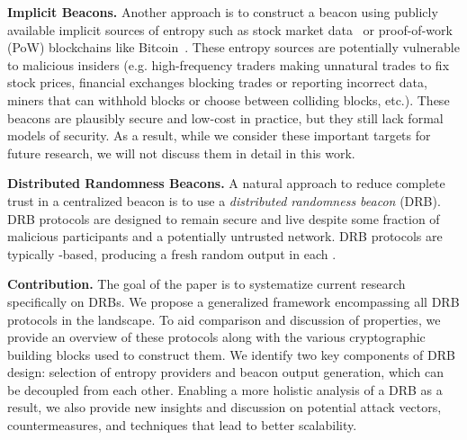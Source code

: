 \textbf{Implicit Beacons.} Another approach is to construct a beacon using publicly available implicit sources of entropy such as stock market data~\cite{clark2010use} or proof-of-work (PoW) blockchains like Bitcoin~\cite{nakamoto2008bitcoin, bentov2016bitcoin, bonneau2015bitcoin, han2020randchain}. These entropy sources are potentially vulnerable to malicious insiders (e.g. high-frequency traders making unnatural trades to fix stock prices, financial exchanges blocking trades or reporting incorrect data, miners that can withhold blocks or choose between colliding blocks, etc.). These beacons are plausibly secure and low-cost in practice, but they still lack formal models of security. As a result, while we consider these important targets for future research, we will not discuss them in detail in this work.

\textbf{Distributed Randomness Beacons.}
A natural approach to reduce complete trust in a centralized beacon is to use a \textit{distributed randomness beacon} (DRB). DRB protocols are designed to remain secure and live despite some fraction of malicious participants and a potentially untrusted network. %
DRB protocols are typically \epoch-based, producing a fresh random output in each \epoch.

\textbf{Contribution.} The goal of the paper is to systematize current research specifically on DRBs. We propose a generalized framework encompassing all DRB protocols in the landscape. To aid comparison and discussion of properties, we provide an overview of these protocols along with the various cryptographic building blocks used to construct them. We identify two key components of DRB design: selection of entropy providers and beacon output generation, which can be decoupled from each other. Enabling a more holistic analysis of a DRB as a result, we also provide new insights and discussion on potential attack vectors, countermeasures, and techniques that lead to better scalability.

